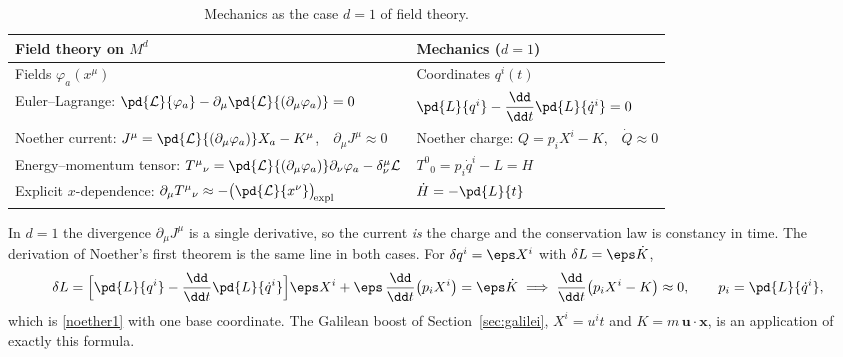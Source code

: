 \begin{table}[ht]
\centering
\small
\renewcommand{\arraystretch}{1.35}
\setlength{\tabcolsep}{4pt}
\begin{tabular}{@{}>{\raggedright\arraybackslash}p{7.3cm}>{\raggedright\arraybackslash}p{7.3cm}@{}}
\toprule
Field theory on $M^d$ & Mechanics ($d=1$)\\
\midrule
Fields $\varphi_a(x^\mu)$ & Coordinates $q^i(t)$\\
Euler--Lagrange: $\pd{\mathcal L}{\varphi_a}-\partial_\mu\pd{\mathcal L}{(\partial_\mu\varphi_a)}=0$
  & $\pd{L}{q^i}-\dfrac{\dd}{\dd t}\pd{L}{\dot q^i}=0$\\
Noether current: $J^\mu=\pd{\mathcal L}{(\partial_\mu\varphi_a)}X_a-K^\mu$,\ \ $\partial_\mu J^\mu\approx0$
  & Noether charge: $Q=p_iX^i-K$,\ \ $\dot Q\approx0$\\
Energy--momentum tensor: $T^\mu{}_\nu=\pd{\mathcal L}{(\partial_\mu\varphi_a)}\partial_\nu\varphi_a-\delta^\mu_\nu\mathcal L$
  & $T^0{}_0=p_i\dot q^i-L=H$\\
Explicit $x$-dependence: $\partial_\mu T^\mu{}_\nu\approx-\big(\pd{\mathcal L}{x^\nu}\big)_{\!\rm expl}$
  & $\dot H=-\pd{L}{t}$\\
\bottomrule
\end{tabular}
\caption{Mechanics as the case $d=1$ of field theory.}
\label{tab:dictionary-dof}
\end{table}

In $d=1$ the divergence $\partial_\mu J^\mu$ is a single derivative, so the
current \emph{is} the charge and the conservation law is constancy in time.
The derivation of Noether's first theorem is the same line in both cases. For
$\delta q^i=\eps X^i$ with $\delta L=\eps\dot K$,
\begin{equation}\label{noether-mech}
  \delta L=\Big[\pd{L}{q^i}-\frac{\dd}{\dd t}\pd{L}{\dot q^i}\Big]\eps X^i
  +\eps\,\frac{\dd}{\dd t}\big(p_iX^i\big)=\eps\dot K
  \;\Longrightarrow\;
  \frac{\dd}{\dd t}\big(p_iX^i-K\big)\approx0,\qquad p_i=\pd{L}{\dot q^i},
\end{equation}
which is \eqref{noether1} with one base coordinate. The Galilean boost of
Section~\ref{sec:galilei}, $X^i=u^it$ and $K=m\,\bm u\!\cdot\!{\bm{x}}$, is an
application of exactly this formula.

